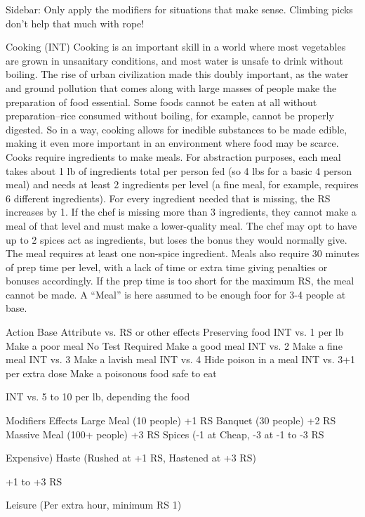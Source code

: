 \documentclass[oneside,11pt,english]{book}
\begin{document}
 
Sidebar: 
Only apply the modifiers for situations that make sense. Climbing picks don’t help that much with rope! 

 

Cooking (INT) 
Cooking is an important skill in a world where most vegetables are grown in unsanitary conditions, and 
most water is unsafe to drink without boiling. The rise of urban civilization made this doubly important, 
as the water and ground pollution that comes along with large masses of people make the preparation of 
food essential. 
Some foods cannot be eaten at all without preparation--rice consumed without boiling, for example, 
cannot be properly digested. So in a way, cooking allows for inedible substances to be made edible, 
making it even more important in an environment where food may be scarce. 
Cooks require ingredients to make meals. For abstraction purposes, each meal takes about 1 lb of 
ingredients total per person fed (so 4 lbs for a basic 4 person meal) and needs at least 2 ingredients per 
level (a fine meal, for example, requires 6 different ingredients). For every ingredient needed that is 
missing, the RS increases by 1. If the chef is missing more than 3 ingredients, they cannot make a meal of 
that level and must make a lower-quality meal. The chef may opt to have up to 2 spices act as ingredients, 
but loses the bonus they would normally give. The meal requires at least one non-spice ingredient. Meals 
also require 30 minutes of prep time per level, with a lack of time or extra time giving penalties or 
bonuses accordingly. If the prep time is too short for the maximum RS, the meal cannot be made. 
A “Meal” is here assumed to be enough foor for 3-4 people at base. 

 

Action Base Attribute vs. RS or other effects 
Preserving food INT vs. 1 per lb 
Make a poor meal No Test Required 
Make a good meal INT vs. 2 
Make a fine meal INT vs. 3 
Make a lavish meal INT vs. 4 
Hide poison in a meal INT vs. 3+1 per extra dose 
Make a poisonous food safe to 
eat 

INT vs. 5 to 10 per lb, depending the food 

Modifiers Effects 
Large Meal (10 people) +1 RS 
Banquet (30 people) +2 RS 
Massive Meal (100+ people) +3 RS 
Spices (-1 at Cheap, -3 at -1 to -3 RS 


Expensive) 
Haste (Rushed at +1 RS, 
Hastened at +3 RS) 

+1 to +3 RS 

Leisure (Per extra hour, 
minimum RS 1) 
\end{document}
